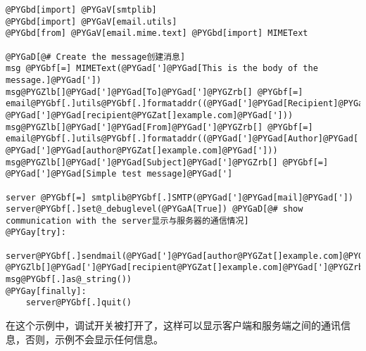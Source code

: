 \documentclass[letterpaper,10pt,english]{manual}
\begin{document}
\begin{Verbatim}[commandchars=@\[\]]
@PYGbd[import] @PYGaV[smtplib]
@PYGbd[import] @PYGaV[email.utils]
@PYGbd[from] @PYGaV[email.mime.text] @PYGbd[import] MIMEText

@PYGaD[@# Create the message创建消息]
msg @PYGbf[=] MIMEText(@PYGad[']@PYGad[This is the body of the message.]@PYGad['])
msg@PYGZlb[]@PYGad[']@PYGad[To]@PYGad[']@PYGZrb[] @PYGbf[=] email@PYGbf[.]utils@PYGbf[.]formataddr((@PYGad[']@PYGad[Recipient]@PYGad['], @PYGad[']@PYGad[recipient@PYGZat[]example.com]@PYGad[']))
msg@PYGZlb[]@PYGad[']@PYGad[From]@PYGad[']@PYGZrb[] @PYGbf[=] email@PYGbf[.]utils@PYGbf[.]formataddr((@PYGad[']@PYGad[Author]@PYGad['], @PYGad[']@PYGad[author@PYGZat[]example.com]@PYGad[']))
msg@PYGZlb[]@PYGad[']@PYGad[Subject]@PYGad[']@PYGZrb[] @PYGbf[=] @PYGad[']@PYGad[Simple test message]@PYGad[']

server @PYGbf[=] smtplib@PYGbf[.]SMTP(@PYGad[']@PYGad[mail]@PYGad['])
server@PYGbf[.]set@_debuglevel(@PYGaA[True]) @PYGaD[@# show communication with the server显示与服务器的通信情况]
@PYGay[try]:
    server@PYGbf[.]sendmail(@PYGad[']@PYGad[author@PYGZat[]example.com]@PYGad['], @PYGZlb[]@PYGad[']@PYGad[recipient@PYGZat[]example.com]@PYGad[']@PYGZrb[], msg@PYGbf[.]as@_string())
@PYGay[finally]:
    server@PYGbf[.]quit()
\end{Verbatim}

在这个示例中，调试开关被打开了，这样可以显示客户端和服务端之间的通讯信息，否则，示例不会显示任何信息。
\end{document}
